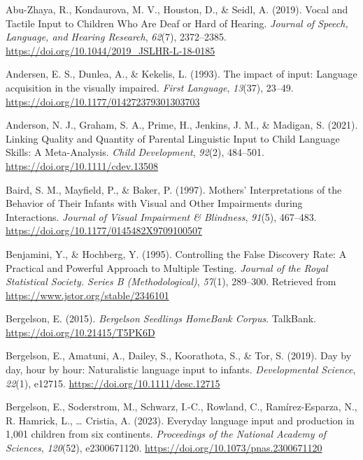 \documentclass[
  man,floatsintext]{apa6}
\newlength{\cslhangindent}
\newlength{\cslentryspacingunit} %
\newenvironment{CSLReferences}[2] %
 {%
  \setlength{\parindent}{0pt}
  \ifodd #1
  \let\oldpar\par
  \def\par{\hangindent=\cslhangindent\oldpar}
  \fi
  \setlength{\parskip}{#2\cslentryspacingunit}
 }%
 {}
\begin{document}
\hypertarget{refs}{}
\begin{CSLReferences}{1}{0}
\leavevmode{}%
Abu-Zhaya, R., Kondaurova, M. V., Houston, D., \& Seidl, A. (2019). Vocal and {Tactile Input} to {Children Who Are Deaf} or {Hard} of {Hearing}. \emph{Journal of Speech, Language, and Hearing Research}, \emph{62}(7), 2372--2385. \url{https://doi.org/10.1044/2019_JSLHR-L-18-0185}

\leavevmode{}%
Andersen, E. S., Dunlea, A., \& Kekelis, L. (1993). The impact of input: Language acquisition in the visually impaired. \emph{First Language}, \emph{13}(37), 23--49. \url{https://doi.org/10.1177/014272379301303703}

\leavevmode{}%
Anderson, N. J., Graham, S. A., Prime, H., Jenkins, J. M., \& Madigan, S. (2021). Linking {Quality} and {Quantity} of {Parental Linguistic Input} to {Child Language Skills}: {A Meta-Analysis}. \emph{Child Development}, \emph{92}(2), 484--501. \url{https://doi.org/10.1111/cdev.13508}

\leavevmode{}%
Baird, S. M., Mayfield, P., \& Baker, P. (1997). Mothers' {Interpretations} of the {Behavior} of {Their Infants} with {Visual} and {Other Impairments} during {Interactions}. \emph{Journal of Visual Impairment \& Blindness}, \emph{91}(5), 467--483. \url{https://doi.org/10.1177/0145482X9709100507}

\leavevmode{}%
Benjamini, Y., \& Hochberg, Y. (1995). Controlling the {False Discovery Rate}: {A Practical} and {Powerful Approach} to {Multiple Testing}. \emph{Journal of the Royal Statistical Society. Series B (Methodological)}, \emph{57}(1), 289--300. Retrieved from \url{https://www.jstor.org/stable/2346101}

\leavevmode{}%
Bergelson, E. (2015). \emph{Bergelson {Seedlings HomeBank Corpus}}. TalkBank. \url{https://doi.org/10.21415/T5PK6D}

\leavevmode{}%
Bergelson, E., Amatuni, A., Dailey, S., Koorathota, S., \& Tor, S. (2019). Day by day, hour by hour: {Naturalistic} language input to infants. \emph{Developmental Science}, \emph{22}(1), e12715. \url{https://doi.org/10.1111/desc.12715}

\leavevmode{}%
Bergelson, E., Soderstrom, M., Schwarz, I.-C., Rowland, C., Ramírez-Esparza, N., R. Hamrick, L., \ldots{} Cristia, A. (2023). Everyday language input and production in 1,001 children from six continents. \emph{Proceedings of the National Academy of Sciences}, \emph{120}(52), e2300671120. \url{https://doi.org/10.1073/pnas.2300671120}


\end{CSLReferences}
\end{document}
